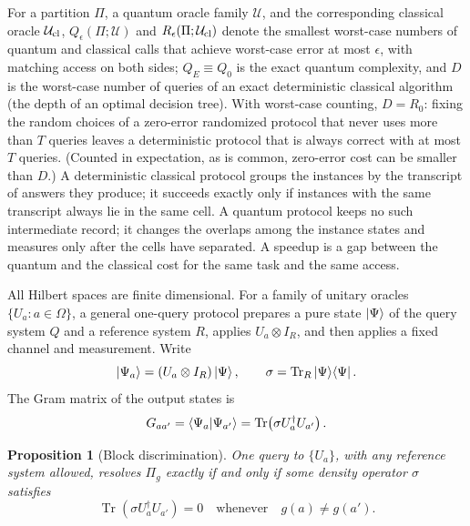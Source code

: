 \documentclass[
  aps,
  pra,
  reprint,
  nofootinbib
]{revtex4-2}
\newtheorem{proposition}{Proposition}
\begin{document}
For a partition \(\Pi\), a quantum oracle family \(\mathcal U\), and the
corresponding classical oracle \(\mathcal U_{\rm cl}\),
\(Q_\epsilon(\Pi;\mathcal U)\) and \(R_\epsilon(\Pi;\mathcal U_{\rm cl})\)
denote the smallest worst-case numbers of quantum and classical calls that
achieve worst-case error at most \(\epsilon\), with matching access on both
sides; \(Q_E\equiv Q_0\) is the exact quantum complexity, and \(D\) is the
worst-case number of queries of an exact deterministic classical algorithm
(the depth of an optimal decision tree). With worst-case counting, \(D=R_0\):
fixing the random choices of a zero-error randomized protocol that never uses
more than \(T\) queries leaves a deterministic protocol that is always correct
with at most \(T\) queries. (Counted in expectation, as is common, zero-error
cost can be smaller than \(D\).) A deterministic classical protocol groups the
instances by the transcript of answers they produce; it succeeds exactly only
if instances with the same transcript always lie in the same cell. A quantum
protocol keeps no such intermediate record; it changes the overlaps among the
instance states and measures only after the cells have separated. A speedup is
a gap between the quantum and the classical cost for the same task and the
same access.

All Hilbert spaces are finite dimensional. For a family of unitary oracles
\(\{U_a:a\in\Omega\}\), a general one-query protocol prepares a pure state
\(\ket\Psi\) of the query system \(Q\) and a reference system \(R\), applies
\(U_a\otimes I_R\), and then applies a fixed channel and measurement. Write
\begin{equation}
 \ket{\Psi_a}=(U_a\otimes I_R)\ket\Psi,
 \qquad
 \sigma=\operatorname{Tr}_R\ket\Psi\!\bra\Psi .
\end{equation}
The Gram matrix of the output states is
\begin{equation}
 G_{aa'}=\braket{\Psi_a|\Psi_{a'}}
 =\operatorname{Tr}\!\left(\sigma U_a^\dagger U_{a'}\right).
 \label{eq:gram}
\end{equation}

\begin{proposition}[Block discrimination]\label{prop:block}
One query to \(\{U_a\}\), with any reference system allowed, resolves
\(\Pi_g\) exactly if and only if some density operator \(\sigma\) satisfies
\begin{equation}
 \operatorname{Tr}\!\left(\sigma U_a^\dagger U_{a'}\right)=0
 \quad\text{whenever}\quad g(a)\ne g(a').
 \label{eq:criterion}
\end{equation}
\end{proposition}
\end{document}
